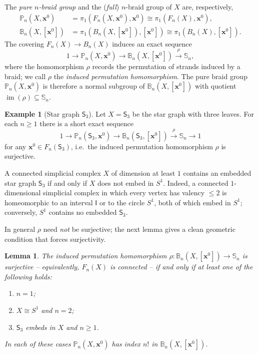 \documentclass[reqno]{amsart}
\newtheorem{lemma}[theorem]{Lemma}
\theoremstyle{definition}
\newtheorem{example}[theorem]{Example}
\newcommand\bfx{\mathbf{x}}
\newcommand\sfS{\mathsf{S}}
\newcommand{\PB}{\mathbb{P}}
\newcommand{\BG}{\mathbb{B}}
\newcommand{\im}{\operatorname{im}}
\newcommand{\base}{\bfx^0}
\numberwithin{equation}{section}
\begin{document}
The \emph{pure \(n\)-braid group} and the
(\emph{full}) \(n\)-braid group of \(X\) are, respectively,
\begin{align*}
\PB_n(X,\base) &= \pi_1(F_n(X,\base),\base)\cong \pi_1(F_n(X),\base),\\
\BG_n(X,[\base]) &= \pi_1(B_n(X,[\base]),[\base])\cong \pi_1(B_n(X),[\base]).
\end{align*}
The covering \(F_n (X)\to B_n(X)\) induces an exact sequence
\[
1 \longrightarrow \PB_n(X,\base)
\longrightarrow \BG_n(X,[\base])
\xrightarrow{\rho} \mathbb{S}_n,
\]
where the homomorphism \(\rho\) records the permutation of strands
induced by a braid; we call \(\rho\) the \emph{induced permutation
homomorphism}. The pure braid group \(\PB_n(X,\base)\) is therefore a
normal subgroup of \(\BG_n(X,[\base])\) with quotient
\(\im(\rho)\subseteq\mathbb{S}_n\). 
\begin{example}[Star graph \(\sfS_3\)]\label{ex:S3}
Let \(X = \sfS_3\) be the star graph with three leaves. For
each \(n\geq 1\) there is a short exact sequence
\[
1 \longrightarrow \PB_n(\sfS_3,\base)
\longrightarrow \BG_n(\sfS_3,[\base])
\xrightarrow{\rho} \mathbb{S}_n
\longrightarrow 1
\]
for any \(\base\in F_n(\sfS_3)\),
i.e.\ the induced permutation homomorphism \(\rho\) is surjective.
\end{example}

A connected simplicial complex \(X\) of dimension at least \(1\)
contains an embedded star graph \(\sfS_3\) if and only if
\(X\) does not embed in \(S^1\). Indeed, a connected \(1\)-dimensional
simplicial complex in which every vertex has valency \(\leq 2\) is
homeomorphic to an interval \(\mathsf{I}\) or to the circle \(S^1\),
both of which embed in \(S^1\); conversely, \(S^1\) contains no
embedded \(\sfS_3\).

In general \(\rho\) need
\emph{not} be surjective; the next lemma gives a clean geometric
condition that forces surjectivity.

\begin{lemma}\label{lem:rho-surj}
The induced permutation homomorphism
\(\rho\colon\BG_n(X,[\base])\to\mathbb{S}_n\) is surjective -- equivalently,
\(F_n(X)\) is connected -- if and only if at least one of the
following holds:
\begin{enumerate}[label=(\arabic*),leftmargin=2em]
    \item \(n = 1\);
    \item \(X\cong S^1\) and \(n = 2\);
    \item \(\sfS_3\) embeds in \(X\) and \(n\geq 1\).
\end{enumerate}
In each of these cases \(\PB_n(X,\base)\) has index \(n!\) in \(\BG_n(X,[\base])\).
\end{lemma}
\end{document}
